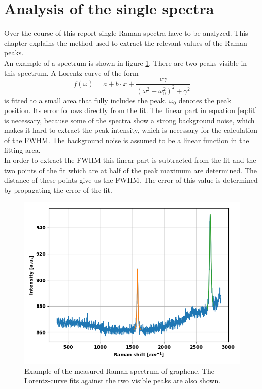 \documentclass[12pt,a4paper]{article}
\begin{document}
\section{Analysis of the single spectra}
Over the course of this report single Raman spectra have to be analyzed. This chapter explains the method used to extract the relevant values of the Raman peaks.\\
An example of a spectrum is shown in figure \ref{fig:example_spectrum}. There are two peaks visible in this spectrum. A Lorentz-curve of the form
\begin{equation}
f(\omega) = a + b \cdot x + \dfrac{c \gamma}{(\omega^2-\omega_0^2)^2 + \gamma^2}
\label{eq:fit}
\end{equation}
is fitted to a small area that fully includes the peak. $\omega_0$ denotes the peak position. Its error follows directly from the fit. The linear part in equation \ref{eq:fit} is necessary, because some of the spectra show a strong background noise, which makes it hard to extract the peak intensity, which is necessary for the calculation of the FWHM. The background noise is assumed to be a linear function in the fitting area.\\
In order to extract the FWHM this linear part is subtracted from the fit and the two points of the fit which are at half of the peak maximum are determined. The distance of these points give us the FWHM. The error of this value is determined by propagating the error of the fit.
\begin{figure}
\centering
\includegraphics[scale=0.5]{Bilder/part6/1.png}
\caption{Example of the measured Raman spectrum of graphene. The Lorentz-curve fits against the two visible peaks are also shown.}
\label{fig:example_spectrum}
\end{figure}
\end{document}
